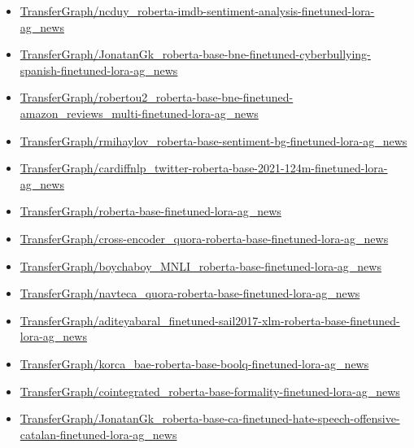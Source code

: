 \documentclass[letterpaper]{article} %
\begin{document}
\begin{itemize}
    \item \href{https://huggingface.co/TransferGraph/ncduy_roberta-imdb-sentiment-analysis-finetuned-lora-ag_news}{\url{TransferGraph/ncduy\_roberta-imdb-sentiment-analysis-finetuned-lora-ag\_news}}
    \item \href{https://huggingface.co/TransferGraph/JonatanGk_roberta-base-bne-finetuned-cyberbullying-spanish-finetuned-lora-ag_news}{\url{TransferGraph/JonatanGk_roberta-base-bne-finetuned-cyberbullying-spanish-finetuned-lora-ag_news}}
    \item \href{https://huggingface.co/TransferGraph/robertou2_roberta-base-bne-finetuned-amazon_reviews_multi-finetuned-lora-ag_news}{\url{TransferGraph/robertou2_roberta-base-bne-finetuned-amazon_reviews_multi-finetuned-lora-ag_news}}
    \item \href{https://huggingface.co/TransferGraph/rmihaylov_roberta-base-sentiment-bg-finetuned-lora-ag_news}{\url{TransferGraph/rmihaylov_roberta-base-sentiment-bg-finetuned-lora-ag_news}}
    \item \href{https://huggingface.co/TransferGraph/cardiffnlp_twitter-roberta-base-2021-124m-finetuned-lora-ag_news}{\url{TransferGraph/cardiffnlp_twitter-roberta-base-2021-124m-finetuned-lora-ag_news}}
    \item \href{https://huggingface.co/TransferGraph/roberta-base-finetuned-lora-ag_news}{\url{TransferGraph/roberta-base-finetuned-lora-ag_news}}
    \item \href{https://huggingface.co/TransferGraph/cross-encoder_quora-roberta-base-finetuned-lora-ag_news}{\url{TransferGraph/cross-encoder_quora-roberta-base-finetuned-lora-ag_news}}
    \item \href{https://huggingface.co/TransferGraph/boychaboy_MNLI_roberta-base-finetuned-lora-ag_news}{\url{TransferGraph/boychaboy_MNLI_roberta-base-finetuned-lora-ag_news}}
    \item \href{https://huggingface.co/TransferGraph/navteca_quora-roberta-base-finetuned-lora-ag_news}{\url{TransferGraph/navteca_quora-roberta-base-finetuned-lora-ag_news}}
    \item \href{https://huggingface.co/TransferGraph/aditeyabaral_finetuned-sail2017-xlm-roberta-base-finetuned-lora-ag_news}{\url{TransferGraph/aditeyabaral_finetuned-sail2017-xlm-roberta-base-finetuned-lora-ag_news}}
    \item \href{https://huggingface.co/TransferGraph/korca_bae-roberta-base-boolq-finetuned-lora-ag_news}{\url{TransferGraph/korca_bae-roberta-base-boolq-finetuned-lora-ag_news}}
    \item \href{https://huggingface.co/TransferGraph/cointegrated_roberta-base-formality-finetuned-lora-ag_news}{\url{TransferGraph/cointegrated_roberta-base-formality-finetuned-lora-ag_news}}
    \item \href{https://huggingface.co/TransferGraph/JonatanGk_roberta-base-ca-finetuned-hate-speech-offensive-catalan-finetuned-lora-ag_news}{\url{TransferGraph/JonatanGk_roberta-base-ca-finetuned-hate-speech-offensive-catalan-finetuned-lora-ag_news}}
\end{itemize}
\end{document}

